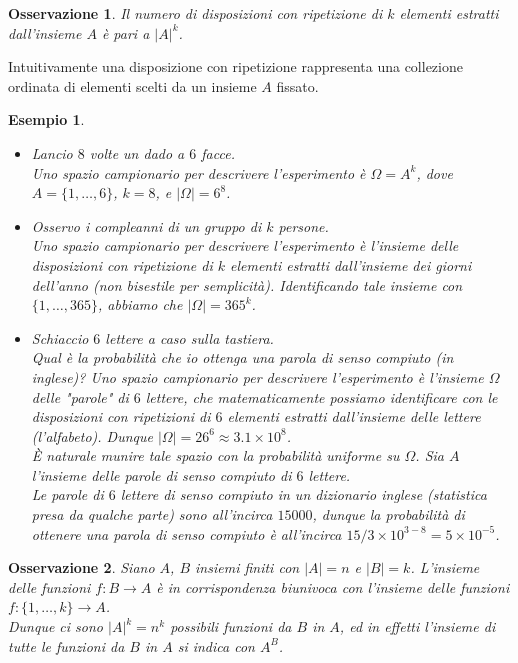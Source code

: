 \documentclass[11pt]{book}
\theoremstyle{Definizione}
\theoremstyle{TeoremaProposizioneLemmaCorollario}
\theoremstyle{OsservazioneNota}
\newtheorem{myobs}{Osservazione}[section]
\newtheorem{myes}{Esempio}[section]
\begin{document}
\begin{myobs}
Il numero di disposizioni con ripetizione di $k$ elementi estratti dall'insieme $A$ è pari a $|A|^k$.
\end{myobs}
\noindent
Intuitivamente una disposizione con ripetizione rappresenta una collezione ordinata di elementi scelti da un insieme $A$ fissato.
\begin{myes}
\hfill
\begin{itemize}
\item[$(a)$] Lancio $8$ volte un dado a $6$ facce.\\
Uno spazio campionario per descrivere l'esperimento è $\Omega = A^k$, dove $A = \{1,\dots,6\}$, $k = 8$, e $|\Omega| = 6^8$.
\item[$(b)$] Osservo i compleanni di un gruppo di $k$ persone.\\
Uno spazio campionario per descrivere l'esperimento è l'insieme delle disposizioni con ripetizione di $k$ elementi estratti dall'insieme dei giorni dell'anno (non bisestile per semplicità). Identificando tale insieme con $\{1,\dots,365\}$, abbiamo che $|\Omega| = 365^k$.
\item[$(c)$] Schiaccio $6$ lettere a caso sulla tastiera.\\
Qual è la probabilità che io ottenga una parola di senso compiuto (in inglese)?
Uno spazio campionario per descrivere l'esperimento è l'insieme $\Omega$ delle "parole" di $6$ lettere, che matematicamente possiamo identificare con le disposizioni con ripetizioni di $6$ elementi estratti dall'insieme delle lettere (l'alfabeto). Dunque $|\Omega| = 26^6\approx 3.1\times 10^8$.\\
È naturale munire tale spazio con la probabilità uniforme su $\Omega$. Sia $A$ l'insieme delle parole di senso compiuto di $6$ lettere.\\
Le parole di $6$ lettere di senso compiuto in un dizionario inglese (statistica presa da qualche parte) sono all'incirca $15000$, dunque la probabilità di ottenere una parola di senso compiuto è all'incirca $15/3 \times 10^{3-8} = 5 \times 10^{-5}$. 
\end{itemize}
\end{myes}
\begin{myobs}
Siano $A$, $B$ insiemi finiti con $|A| = n$ e $|B| = k$. L'insieme delle funzioni $f: B\longrightarrow A$ è in corrispondenza biunivoca con l'insieme delle funzioni $f:\{1,\dots,k\}\longrightarrow A$.\\
Dunque ci sono $|A|^k = n^k$ possibili funzioni da $B$ in $A$, ed in effetti l'insieme di tutte le funzioni da $B$ in $A$ si indica con $A^B$.
\end{myobs}
\end{document}
